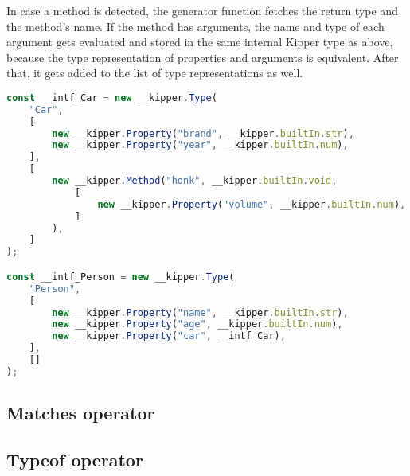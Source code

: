  In case a method is detected, the generator function fetches the return type and the method's name. If the method has arguments, the name and type of each argument gets evaluated and stored in the same internal Kipper type as above, because the type representation of properties and arguments is equivalent. After that, it gets added to the list of type representations as well.

\begin{lstlisting}[language=Typescript,caption=The runtime representation of the previous interfaces,label=lst:implementation:runtimeinterface]
const __intf_Car = new __kipper.Type(
	"Car",
	[
		new __kipper.Property("brand", __kipper.builtIn.str),
		new __kipper.Property("year", __kipper.builtIn.num),
	],
	[
		new __kipper.Method("honk", __kipper.builtIn.void, 
			[
				new __kipper.Property("volume", __kipper.builtIn.num),
			]
		),
	]
);

const __intf_Person = new __kipper.Type(
	"Person",
	[
		new __kipper.Property("name", __kipper.builtIn.str),
		new __kipper.Property("age", __kipper.builtIn.num),
		new __kipper.Property("car", __intf_Car),
	],
	[]
);
\end{lstlisting}



\subsection{Matches operator}

\subsection{Typeof operator}
